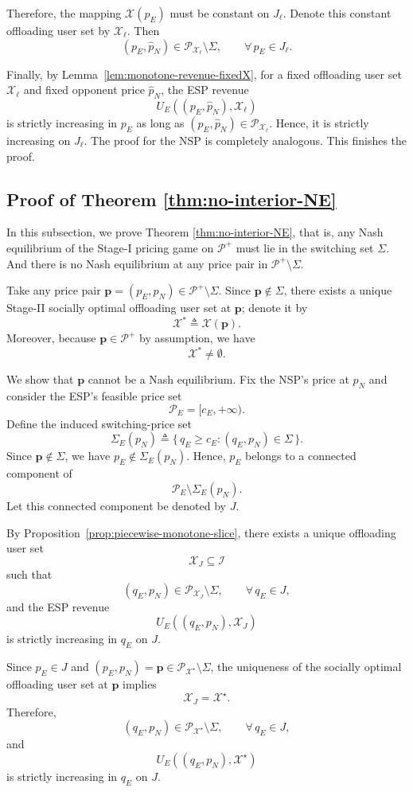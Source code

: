 \documentclass[lettersize,journal]{IEEEtran}
\begin{document}
Therefore, the mapping $\mathcal X(p_E)$ must be constant on $J_\ell$.
Denote this constant offloading user set by $\mathcal X_\ell$.
Then
\[
(p_E,\hat p_N)\in \mathcal P_{\mathcal X_\ell}\setminus \Sigma,
\qquad \forall\, p_E\in J_\ell.
\]

Finally, by Lemma~\ref{lem:monotone-revenue-fixedX}, for a fixed offloading user set $\mathcal X_\ell$ and fixed opponent price $\hat p_N$, the ESP revenue
\[
U_E((p_E,\hat p_N),\mathcal X_\ell)
\]
is strictly increasing in $p_E$ as long as $(p_E,\hat p_N)\in \mathcal P_{\mathcal X_\ell}$.
Hence, it is strictly increasing on $J_\ell$.
The proof for the NSP is completely analogous. This finishes the proof.

\subsection{Proof of Theorem \ref{thm:no-interior-NE}}\label{proof:no-interior-NE}
In this subsection, we prove Theorem \ref{thm:no-interior-NE}, that is, any Nash equilibrium of the Stage-I pricing game on $\mathcal P^{+}$ must lie in the switching set $\Sigma$. And there is no Nash equilibrium at any price pair in $\mathcal P^{+}\setminus\Sigma$.

Take any price pair $\boldsymbol p=(p_E,p_N)\in\mathcal P^{+}\setminus\Sigma$.
Since $\boldsymbol p\notin\Sigma$, there exists a unique Stage-II socially optimal offloading user set at $\boldsymbol p$; denote it by
\[
\mathcal X^* \triangleq \mathcal X(\boldsymbol p).
\]
Moreover, because $\boldsymbol p\in\mathcal P^{+}$ by assumption, we have
\[
\mathcal X^*\neq\emptyset.
\]

We show that $\boldsymbol p$ cannot be a Nash equilibrium.
Fix the NSP's price at $p_N$ and consider the ESP's feasible price set
\[
\mathcal P_E=[c_E,+\infty).
\]
Define the induced switching-price set
\[
\Sigma_E(p_N)\triangleq \{\,q_E\ge c_E:(q_E,p_N)\in\Sigma\,\}.
\]
Since $\boldsymbol p\notin\Sigma$, we have $p_E\notin \Sigma_E(p_N)$.
Hence, $p_E$ belongs to a connected component of
\[
\mathcal P_E\setminus \Sigma_E(p_N).
\]
Let this connected component be denoted by $J$.

By Proposition~\ref{prop:piecewise-monotone-slice}, there exists a unique offloading user set
\[
\mathcal X_J\subseteq\mathcal I
\]
such that
\[
(q_E,p_N)\in \mathcal P_{\mathcal X_J}\setminus\Sigma,
\qquad \forall\, q_E\in J,
\]
and the ESP revenue
\[
U_E((q_E,p_N),\mathcal X_J)
\]
is strictly increasing in $q_E$ on $J$.

Since $p_E\in J$ and $(p_E,p_N)=\boldsymbol p\in \mathcal P_{\mathcal X^\star}\setminus\Sigma$, the uniqueness of the socially optimal offloading user set at $\boldsymbol p$ implies
\[
\mathcal X_J=\mathcal X^\star.
\]
Therefore,
\[
(q_E,p_N)\in \mathcal P_{\mathcal X^\star}\setminus\Sigma,
\qquad \forall\, q_E\in J,
\]
and
\[
U_E((q_E,p_N),\mathcal X^\star)
\]
is strictly increasing in $q_E$ on $J$.
\end{document}
